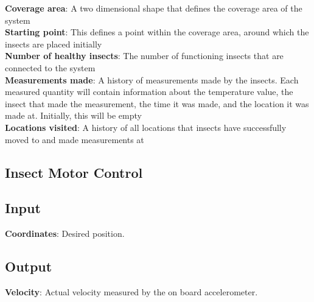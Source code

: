 \documentclass[11pt]{article}
\begin{document}
\textbf{Coverage area}: A two dimensional shape that defines the coverage area of the system \\
\textbf{Starting point}: This defines a point within the coverage area, around which the insects are placed initially\\
\textbf{Number of healthy insects}: The number of functioning insects that are connected to the system\\
\textbf{Measurements made}: A history of measurements made by the insects. Each measured quantity will contain information about the
temperature value, the insect that made the measurement, the time it was made, and the location it was made at. Initially, this will
be empty\\
\textbf{Locations visited}: A history of all locations that insects have successfully moved to and made measurements at\\

\subsection{Insect Motor Control}
\subsection{Input}
\textbf{Coordinates}: Desired position.
\subsection{Output}
\textbf{Velocity}: Actual velocity measured by the on board accelerometer.
\end{document}
